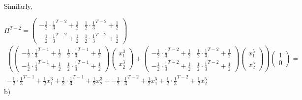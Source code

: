 Similarly, 

$\Pi^{T-2}=
\begin{pmatrix}
-\frac{1}{2} \cdot\frac{1}{3}^{T-2} +\frac{1}{2} & \frac{1}{2} \cdot\frac{1}{3}^{T-2} +\frac{1}{2} \\
-\frac{1}{2} \cdot\frac{1}{3}^{T-2} +\frac{1}{2} & \frac{1}{2} \cdot\frac{1}{3}^{T-2} +\frac{1}{2}
\end{pmatrix} $
\begin{gather*}
\left(\begin{pmatrix}
-\frac{1}{2} \cdot\frac{1}{3}^{T-1} +\frac{1}{2} & \frac{1}{2} \cdot\frac{1}{3}^{T-1} +\frac{1}{2} \\
-\frac{1}{2} \cdot\frac{1}{3}^{T-1} +\frac{1}{2} & \frac{1}{2} \cdot\frac{1}{3}^{T-1} +\frac{1}{2}
\end{pmatrix}
\begin{pmatrix}
x_1^3 \\
x_2^3 
\end{pmatrix}+ 
\begin{pmatrix}
-\frac{1}{2} \cdot\frac{1}{3}^{T-2} +\frac{1}{2} & \frac{1}{2} \cdot\frac{1}{3}^{T-2} +\frac{1}{2} \\
-\frac{1}{2} \cdot\frac{1}{3}^{T-2} +\frac{1}{2} & \frac{1}{2} \cdot\frac{1}{3}^{T-2} +\frac{1}{2}
\end{pmatrix}
\begin{pmatrix}
x_1^5 \\
x_2^5 
\end{pmatrix}\right)\begin{pmatrix}
    1 \\ 0
    \end{pmatrix} =\\
-\frac{1}{2} \cdot\frac{1}{3}^{T-1} +\frac{1}{2} x_1^3+\frac{1}{2} \cdot\frac{1}{3}^{T-1} +\frac{1}{2} x_2^3 +-\frac{1}{2} \cdot\frac{1}{3}^{T-2} +\frac{1}{2} x_1^5 +\frac{1}{2} \cdot\frac{1}{3}^{T-2} +\frac{1}{2} x_2^5
\end{gather*}
b)
